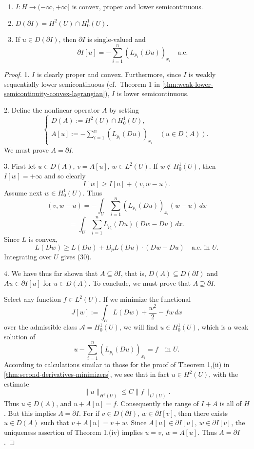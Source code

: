 \begin{theorem}
\label{thm:characterization-subdifferential-uniformly-convex-lagrangian}
\begin{enumerate}
\item[(i)] $I : H \to (-\infty, +\infty]$ is convex, proper and lower semicontinuous.
\item[(ii)] $D(\partial I) = H^2(U) \cap H_0^1(U)$.
\item[(iii)] If $u \in D(\partial I)$, then $\partial I$ is single-valued and
\[
\partial I[u] = -\sum_{i=1}^n (L_{p_i}(Du))_{x_i} \quad \text{a.e.}
\]
\end{enumerate}
\end{theorem}
\begin{proof}
1. $I$ is clearly proper and convex. Furthermore, since $I$ is weakly sequentially lower semicontinuous (cf.\ Theorem 1 in \cref{thm:weak-lower-semicontinuity-convex-lagrangian}), $I$ is lower semicontinuous.

2. Define the nonlinear operator $A$ by setting
\[
\begin{cases}
D(A) := H^2(U) \cap H_0^1(U), \\
A[u] := -\sum_{i=1}^n (L_{p_i}(Du))_{x_i} \quad (u \in D(A)).
\end{cases}
\]
We must prove $A = \partial I$.

3. First let $u \in D(A)$, $v = A[u]$, $w \in L^2(U)$. If $w \notin H_0^1(U)$, then $I[w] = +\infty$ and so clearly
\[
I[w] \geq I[u] + (v, w - u).
\tag{30}
\]
Assume next $w \in H_0^1(U)$. Thus
\[
(v, w - u) = - \int_U \sum_{i=1}^n (L_{p_i}(Du))_{x_i}(w - u) \, dx
\]
\[
= \int_U \sum_{i=1}^n L_{p_i}(Du)(Dw - Du) \, dx.
\]
Since $L$ is convex,
\[
L(Dw) \geq L(Du) + D_p L(Du) \cdot (Dw - Du) \quad \text{a.e. in } U.
\]
Integrating over $U$ gives (30).

4. We have thus far shown that $A \subseteq \partial I$, that is, $D(A) \subseteq D(\partial I)$ and $Au \in \partial I[u]$ for $u \in D(A)$. To conclude, we must prove that $A \supseteq \partial I$.

Select any function $f \in L^2(U)$. If we minimize the functional
\[
J[w] := \int_U L(Dw) + \frac{w^2}{2} - fw \, dx
\]
over the admissible class $\mathcal{A} = H_0^1(U)$, we will find $u \in H_0^1(U)$, which is a weak solution of
\[
u - \sum_{i=1}^n (L_{p_i}(Du))_{x_i} = f \quad \text{in } U.
\tag{31}
\]
According to calculations similar to those for the proof of Theorem 1,(ii) in \cref{thm:second-derivatives-minimizers}, we see that in fact $u \in H^2(U)$, with the estimate
\[
\|u\|_{H^2(U)} \leq C\|f\|_{L^2(U)}.
\tag{32}
\]
Thus $u \in D(A)$, and $u + A[u] = f$. Consequently the range of $I + A$ is all of $H$. But this implies $A = \partial I$. For if $v \in D(\partial I)$, $w \in \partial I[v]$, then there exists $u \in D(A)$ such that $v + A[u] = v + w$. Since $A[u] \in \partial I[u]$, $w \in \partial I[v]$, the uniqueness assertion of Theorem 1,(iv) implies $u = v$, $w = A[u]$. Thus $A = \partial I$.
\end{proof}

